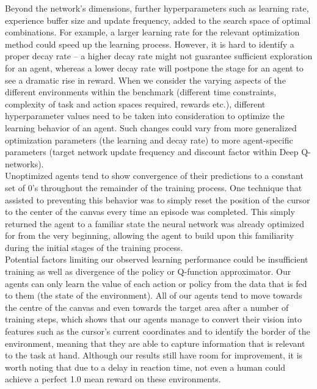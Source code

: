 \documentclass[10pt,journal,compsoc]{IEEEtran}
\begin{document}
Beyond the network's dimensions, further hyperparameters such as learning rate, experience buffer size and update frequency, added to the search space of optimal combinations.
For example, a larger learning rate for the relevant optimization method could speed up the learning process. However, it is hard to identify a proper decay rate -- a higher decay rate might not guarantee sufficient exploration for an agent, whereas a lower decay rate will postpone the stage for an agent to see a dramatic rise in reward. When we consider the varying aspects of the different environments within the benchmark (different time constraints, complexity of task and action spaces required, rewards etc.), different hyperparameter values need to be taken into consideration to optimize the learning behavior of an agent. Such changes could vary from more generalized optimization parameters (the learning and decay rate) to more agent-specific parameters (target network update frequency and discount factor within Deep Q-networks). \\

Unoptimized agents tend to show convergence of their predictions to a constant set of 0's throughout the remainder of the training process. One technique that assisted to preventing this behavior was to simply reset the position of the cursor to the center of the canvas every time an episode was completed. This simply returned the agent to a familiar state the neural network was already optimized for from the very beginning, allowing the agent to build upon this familiarity during the initial stages of the training process. \\

Potential factors limiting our observed learning performance could be insufficient training as well as divergence of the policy or Q-function approximator. Our agents can only learn the value of each action or policy from the data that is fed to them (the state of the environment). All of our agents tend to move towards the centre of the canvas and even towards the target area after a number of training steps, which shows that our agents manage to convert their vision into features such as the cursor's current coordinates and to identify the border of the environment, meaning that they are able to capture information that is relevant to the task at hand. Although our results still have room for improvement, it is worth noting that due to a delay in reaction time, not even a human could achieve a perfect 1.0 mean reward on these environments.
 
\end{document}
